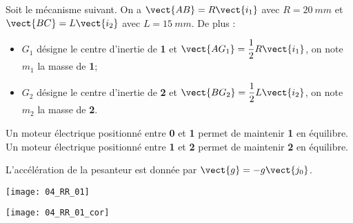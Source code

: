 \normaltrue
\correctiontrue


\setcounter{question}{0}
\ifcorrection
\else
{}
\fi

\ifprof
\else
Soit le mécanisme suivant. On a $\vect{AB}=R\vect{i_1}$ avec $R=\SI{20}{mm}$ et  
$\vect{BC}=L\vect{i_2}$ avec $L=\SI{15}{mm}$. De plus :
\begin{itemize}
\item $G_1$ désigne le centre d'inertie de \textbf{1} et $\vect{AG_1}=\dfrac{1}{2}R\vect{i_1}$, on note $m_1$ la masse de \textbf{1}; %
\item $G_2$ désigne le centre d'inertie de \textbf{2} et $\vect{BG_2}=\dfrac{1}{2}L\vect{i_2}$, on note $m_2$ la masse de \textbf{2}.%
\end{itemize}

Un moteur électrique positionné entre \textbf{0} et \textbf{1} permet de maintenir \textbf{1} en équilibre.
Un moteur électrique positionné entre \textbf{1} et \textbf{2} permet de maintenir \textbf{2} en équilibre.

L'accélération de la pesanteur est donnée par $\vect{g}=-g\vect{j_0}$.

\begin{center}
\texttt{[image: 04\_RR\_01]}
\end{center}
\fi

\ifprof
\begin{center}
\texttt{[image: 04\_RR\_01\_cor]}
\end{center}
\else
\fi

